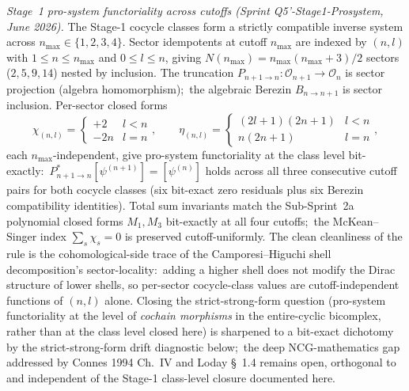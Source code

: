 \documentclass[11pt,a4paper]{article}
\theoremstyle{plain}
\theoremstyle{definition}
\begin{document}
\emph{Stage~1 pro-system functoriality across cutoffs (Sprint
Q5'-Stage1-Prosystem, June 2026).}
The Stage-1 cocycle classes form a strictly compatible inverse system
across $n_{\max} \in \{1, 2, 3, 4\}$.  Sector idempotents at cutoff
$n_{\max}$ are indexed by $(n, l)$ with $1 \le n \le n_{\max}$ and
$0 \le l \le n$, giving $N(n_{\max}) = n_{\max}(n_{\max}+3)/2$ sectors
($2, 5, 9, 14$) nested by inclusion.  The truncation
$P_{n+1 \to n}: \mathcal{O}_{n+1} \to \mathcal{O}_n$ is sector
projection (algebra homomorphism);\ the algebraic Berezin
$B_{n \to n+1}$ is sector inclusion.  Per-sector closed forms
\[
   \chi_{(n, l)} = \begin{cases} +2 & l < n \\ -2n & l = n \end{cases},
   \qquad
   \eta_{(n, l)} = \begin{cases} (2l+1)(2n+1) & l < n \\ n(2n+1) & l = n \end{cases},
\]
each $n_{\max}$-independent, give pro-system functoriality at the
class level bit-exactly:\ $P^*_{n+1 \to n}[\psi^{(n+1)}] = [\psi^{(n)}]$
holds across all three consecutive cutoff pairs for both cocycle
classes (six bit-exact zero residuals plus six Berezin compatibility
identities).  Total sum invariants match the Sub-Sprint~2a polynomial
closed forms $M_1, M_3$ bit-exactly at all four cutoffs;\ the
McKean--Singer index $\sum_s \chi_s = 0$ is preserved cutoff-uniformly.
The clean cleanliness of the rule is the cohomological-side trace of
the Camporesi--Higuchi shell decomposition's sector-locality:\ adding
a higher shell does not modify the Dirac structure of lower shells,
so per-sector cocycle-class values are cutoff-independent functions of
$(n, l)$ alone.  Closing the strict-strong-form question (pro-system
functoriality at the level of \emph{cochain morphisms} in the
entire-cyclic bicomplex, rather than at the class level closed here)
is sharpened to a bit-exact dichotomy by the strict-strong-form drift
diagnostic below;\ the deep NCG-mathematics gap addressed by
Connes 1994 Ch.~IV and Loday \S~1.4 remains open, orthogonal to and
independent of the Stage-1 class-level closure documented here.
\end{document}
